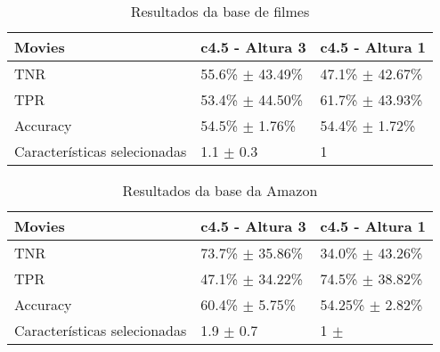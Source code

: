  \begin{table}[!h]
    \begin{tabular}{lll}
    Movies         				 					  & c4.5 - Altura 3                                 	 	 & c4.5 - Altura 1                               \\ \hline
    TNR                   					  		  & 55.6\% $\pm$ 43.49\% 			 				& 47.1\% $\pm$ 42.67\% \\
    TPR                        					  	  & 53.4\% $\pm$ 44.50\% 		 					& 61.7\% $\pm$ 43.93\% \\
    Accuracy                   					  & 54.5\% $\pm$ 1.76\% 			 				& 54.4\% $\pm$ 1.72\% \\
    Características selecionadas      & 1.1 $\pm$ 0.3            			 					& 1                                     \\
    \end{tabular}
    \caption{Resultados da base de filmes}
	\label{table:movies_h3}
\end{table}

%
%
%

\begin{table}[!h]
    \begin{tabular}{lll}
    Movies         										& c4.5 - Altura 3                          		& c4.5 - Altura 1                              \\ \hline
    TNR                     								& 73.7\% $\pm$ 35.86\% 					& 34.0\% $\pm$ 43.26\%  \\
    TPR                          						& 47.1\% $\pm$ 34.22\% 					& 74.5\% $\pm$ 38.82\% \\
    Accuracy                     					& 60.4\% $\pm$ 5.75\% 						& 54.25\% $\pm$ 2.82\% \\
    Características selecionadas 		& 1.9 $\pm$ 0.7               					& 1 $\pm$                                  \\
    \end{tabular}
    \caption{Resultados da base da Amazon}
	\label{table:amazon_h3}
\end{table}

%
%
%

